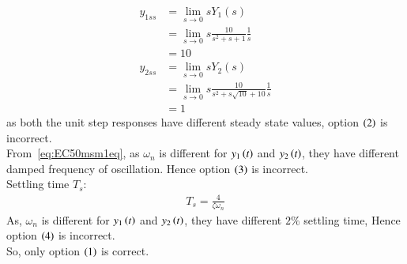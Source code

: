 \documentclass[journal,12pt,onecolumn]{IEEEtran}
\theoremstyle{remark}
\begin{document}
    \begin{align}
    y_{1ss} &= \lim_{{s \to 0}} sY_{1}(s)\\
    &= \lim_{{s \to 0}} s \frac{10}{s^{2} + s + 1}  \frac{1}{s}\\
    &= 10\\
    y_{2ss} &= \lim_{{s \to 0}} sY_{2}(s)\\
    &= \lim_{{s \to 0}} s \frac{10}{s^{2}+s\sqrt{10} +10}  \frac{1}{s}\\
    &= 1
    \end{align} 
    as both the unit step responses have different steady state values, option $\left(2\right)$ is incorrect.\\
    From~\eqref{eq:EC50msm1eq}, as $\omega_{n}$ is different for $y_{1}\left(t\right)$ and $y_{2}\left(t\right)$, they have different damped frequency of oscillation. Hence option $\left(3\right)$ is incorrect.\\
    Settling time $T_s$:
    \begin{align}
    T_s = \frac{4}{\zeta \omega_n}
    \end{align}
    As, $\omega_{n}$ is different for $y_{1}\left(t\right)$ and $y_{2}\left(t\right)$, they have different $2\%$ settling time, Hence option $\left(4\right)$ is incorrect.\\
    So, only option $\left(1\right)$ is correct.   
\end{document}
